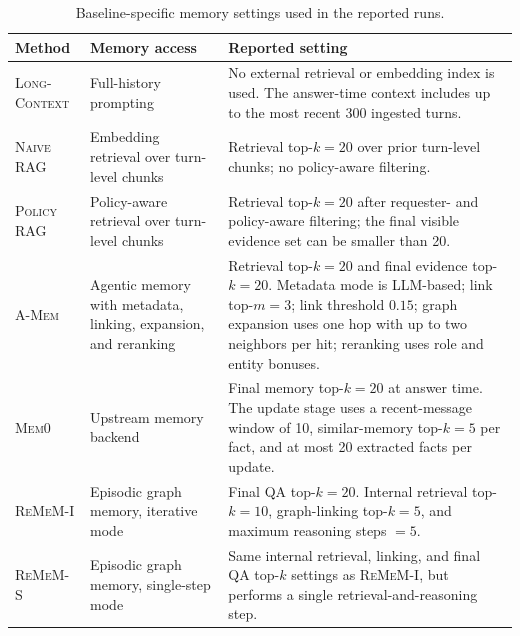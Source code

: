 \begin{table}[t]
\centering
\caption{
Baseline-specific memory settings used in the reported runs.
}
\label{tab:baseline-memory-settings}
\vspace{2pt}
\begingroup
\footnotesize
\setlength{\tabcolsep}{4.2pt}
\renewcommand{\arraystretch}{1.12}
\begin{tabularx}{0.98\textwidth}{
@{}
>{\raggedright\arraybackslash}p{}
>{\raggedright\arraybackslash}p{}
>{\raggedright\arraybackslash}X
@{}}
\toprule
\rowcolor{black!6}
\textbf{Method} & \textbf{Memory access} & \textbf{Reported setting} \\
\midrule

\textsc{Long-Context}
& Full-history prompting
& No external retrieval or embedding index is used. The answer-time context includes up to the most recent 300 ingested turns. \\

\textsc{Naive RAG}
& Embedding retrieval over turn-level chunks
& Retrieval top-$k{=}20$ over prior turn-level chunks; no policy-aware filtering. \\

\textsc{Policy RAG}
& Policy-aware retrieval over turn-level chunks
& Retrieval top-$k{=}20$ after requester- and policy-aware filtering; the final visible evidence set can be smaller than 20. \\

\textsc{A-Mem}
& Agentic memory with metadata, linking, expansion, and reranking
& Retrieval top-$k{=}20$ and final evidence top-$k{=}20$. Metadata mode is LLM-based; link top-$m{=}3$; link threshold $0.15$; graph expansion uses one hop with up to two neighbors per hit; reranking uses role and entity bonuses. \\

\textsc{Mem0}
& Upstream memory backend
& Final memory top-$k{=}20$ at answer time. The update stage uses a recent-message window of 10, similar-memory top-$k{=}5$ per fact, and at most 20 extracted facts per update. \\

\textsc{ReMeM-I}
& Episodic graph memory, iterative mode
& Final QA top-$k{=}20$. Internal retrieval top-$k{=}10$, graph-linking top-$k{=}5$, and maximum reasoning steps $=5$. \\

\textsc{ReMeM-S}
& Episodic graph memory, single-step mode
& Same internal retrieval, linking, and final QA top-$k$ settings as \textsc{ReMeM-I}, but performs a single retrieval-and-reasoning step. \\

\bottomrule
\end{tabularx}
\endgroup
\end{table}

